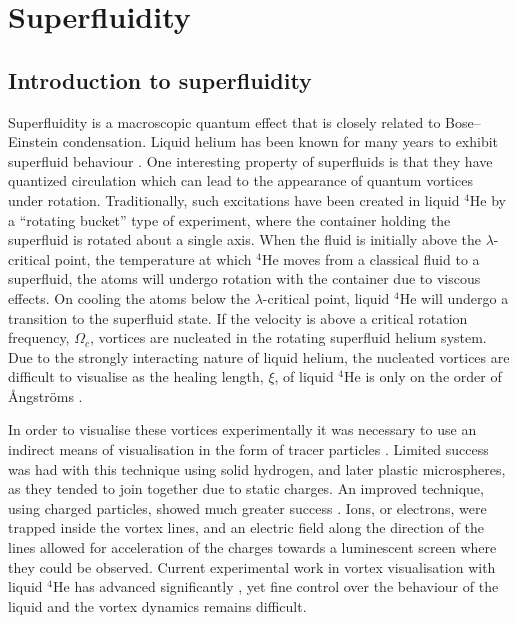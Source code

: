 \section{Superfluidity}\label{sec:superfluid}
\subsection{Introduction to superfluidity}\label{sec:intro_super}

Superfluidity is a macroscopic quantum effect that is closely related to Bose--Einstein condensation. Liquid helium has been known for many years to exhibit superfluid behaviour \cite{BEC:Penrose_pr_1956}. One interesting property of superfluids is that they have quantized circulation which can lead to the appearance of quantum vortices under rotation. Traditionally, such excitations have been created in liquid $^4$He by a ``rotating bucket'' type of experiment, where the container holding the superfluid is rotated about a single axis. When the fluid is initially above the $\lambda$-critical point, the temperature at which $^4$He moves from a classical fluid to a superfluid, the atoms will undergo rotation with the container due to viscous effects. On cooling the atoms below the $\lambda$-critical point, liquid $^4$He will undergo a transition to the superfluid state. If the velocity is above a critical rotation frequency, $\Omega_c$, vortices are nucleated in the rotating superfluid helium system. Due to the strongly interacting nature of liquid helium, the nucleated vortices are difficult to visualise as the healing length, $\xi$, of liquid $^4$He is only on the order of {\r{A}}ngstr{\"o}ms \cite{BEC:Srinivasen_pramana_2006}.

In order to visualise these vortices experimentally it was necessary to use an indirect means of visualisation in the form of tracer particles \cite{BEC:Packard_physb_1982}. Limited success was had with this technique using solid hydrogen, and later plastic microspheres, as they tended to join together due to static charges. An improved technique, using charged particles, showed much greater success \cite{Vtx:Packard_prl_1969}. Ions, or electrons, were trapped inside the vortex lines, and an electric field along the direction of the lines allowed for acceleration of the charges towards a luminescent screen where they could be observed. Current experimental work in vortex visualisation with liquid $^4$He has advanced significantly \cite{Vtx:Tsubota_arxiv_2010,Vtx:Guo_pnas_2014}, yet fine control over the behaviour of the liquid and the vortex dynamics remains difficult.


